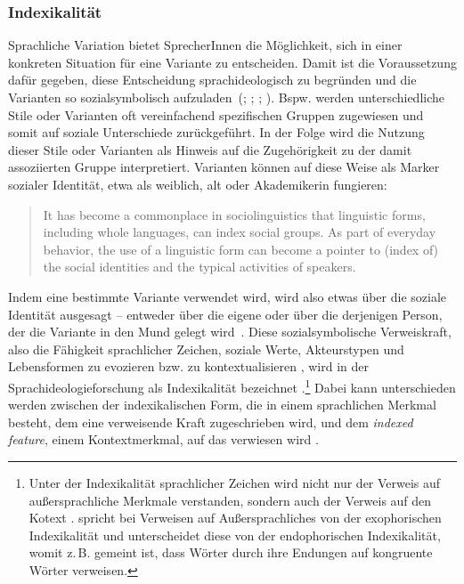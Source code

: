\subsubsection{Indexikalität}
\label{sec:Indexikalitaet}
Sprachliche Variation bietet SprecherInnen die M{\"o}glichkeit, sich in einer konkreten Situation f{\"u}r eine Variante zu entscheiden. 
Damit ist die Voraussetzung dafür gegeben, diese Entscheidung sprachideologisch zu begründen und die Varianten so sozialsymbolisch aufzuladen~(\citealp[s. u.\,a.][]{Silverstein1979}; \citealp{HessLuttich2005}; \citealp{Eckert2008}; \citealp{Spitzmuller2013}). 
Bspw. werden unterschiedliche Stile oder Varianten oft vereinfachend spezifischen Gruppen zugewiesen und somit auf soziale Unterschiede zur{\"u}ckgef{\"u}hrt. 
In der Folge wird die Nutzung dieser Stile oder Varianten als Hinweis auf die Zugehörigkeit zu der damit assoziierten Gruppe interpretiert. 
Varianten k{\"o}nnen auf diese Weise als Marker sozialer Identität, etwa als weiblich, alt oder Akademikerin fungieren:
\begin{quote} It has become a commonplace in sociolinguistics that linguistic forms, including whole languages, can index social groups. As part of everyday behavior, the use of a linguistic form can become a pointer to (index of) the social identities and the typical activities of speakers.~\citep[36]{Irvine2000}\end{quote}
Indem eine bestimmte Variante verwendet wird, wird also etwas {\"u}ber die soziale Identit{\"a}t ausgesagt -- entweder über die eigene oder über die derjenigen Person, der die Variante in den Mund gelegt wird~\citep[s.][222]{Silverstein.1985}. 
Diese sozialsymbolische Verweiskraft, also \glqq die Fähigkeit sprachlicher Zeichen, soziale Werte, Akteurstypen und Lebensformen zu evozieren bzw. zu kontextualisieren\grqq{} \citep[265]{Spitzmuller2013}, wird in der Sprachideologieforschung als Indexikalität bezeichnet \citep[s.][]{Silverstein1979,Silverstein2003}.\footnote{Unter der Indexikalität sprachlicher Zeichen wird nicht nur der Verweis auf außersprachliche Merkmale verstanden, sondern auch der Verweis auf den Kotext \citep[s.][6--8]{Auer.1995}. \citet[42]{Auer.1989} spricht bei Verweisen auf Außersprachliches von der exophorischen Indexikalität und unterscheidet diese von der endophorischen Indexikalität, womit z.\,B. gemeint ist, dass Wörter durch ihre Endungen auf kongruente Wörter verweisen.}
Dabei kann unterschieden werden zwischen der indexikalischen Form, die in einem sprachlichen Merkmal besteht, dem eine verweisende Kraft zugeschrieben wird, und dem \textit{indexed feature}, einem Kontextmerkmal, auf das verwiesen wird \citep[s.][2]{Auer.1995}.

